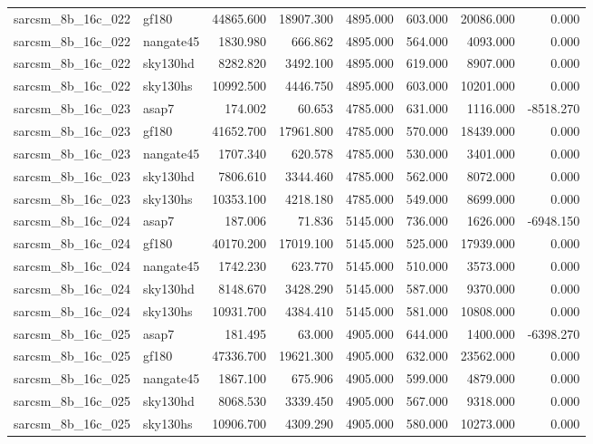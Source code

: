 \begin{tabular}{llrrrrrr}
sarcsm\_8b\_16c\_022 & gf180 & 44865.600 & 18907.300 & 4895.000 & 603.000 & 20086.000 & 0.000 \\
sarcsm\_8b\_16c\_022 & nangate45 & 1830.980 & 666.862 & 4895.000 & 564.000 & 4093.000 & 0.000 \\
sarcsm\_8b\_16c\_022 & sky130hd & 8282.820 & 3492.100 & 4895.000 & 619.000 & 8907.000 & 0.000 \\
sarcsm\_8b\_16c\_022 & sky130hs & 10992.500 & 4446.750 & 4895.000 & 603.000 & 10201.000 & 0.000 \\
sarcsm\_8b\_16c\_023 & asap7 & 174.002 & 60.653 & 4785.000 & 631.000 & 1116.000 & -8518.270 \\
sarcsm\_8b\_16c\_023 & gf180 & 41652.700 & 17961.800 & 4785.000 & 570.000 & 18439.000 & 0.000 \\
sarcsm\_8b\_16c\_023 & nangate45 & 1707.340 & 620.578 & 4785.000 & 530.000 & 3401.000 & 0.000 \\
sarcsm\_8b\_16c\_023 & sky130hd & 7806.610 & 3344.460 & 4785.000 & 562.000 & 8072.000 & 0.000 \\
sarcsm\_8b\_16c\_023 & sky130hs & 10353.100 & 4218.180 & 4785.000 & 549.000 & 8699.000 & 0.000 \\
sarcsm\_8b\_16c\_024 & asap7 & 187.006 & 71.836 & 5145.000 & 736.000 & 1626.000 & -6948.150 \\
sarcsm\_8b\_16c\_024 & gf180 & 40170.200 & 17019.100 & 5145.000 & 525.000 & 17939.000 & 0.000 \\
sarcsm\_8b\_16c\_024 & nangate45 & 1742.230 & 623.770 & 5145.000 & 510.000 & 3573.000 & 0.000 \\
sarcsm\_8b\_16c\_024 & sky130hd & 8148.670 & 3428.290 & 5145.000 & 587.000 & 9370.000 & 0.000 \\
sarcsm\_8b\_16c\_024 & sky130hs & 10931.700 & 4384.410 & 5145.000 & 581.000 & 10808.000 & 0.000 \\
sarcsm\_8b\_16c\_025 & asap7 & 181.495 & 63.000 & 4905.000 & 644.000 & 1400.000 & -6398.270 \\
sarcsm\_8b\_16c\_025 & gf180 & 47336.700 & 19621.300 & 4905.000 & 632.000 & 23562.000 & 0.000 \\
sarcsm\_8b\_16c\_025 & nangate45 & 1867.100 & 675.906 & 4905.000 & 599.000 & 4879.000 & 0.000 \\
sarcsm\_8b\_16c\_025 & sky130hd & 8068.530 & 3339.450 & 4905.000 & 567.000 & 9318.000 & 0.000 \\
sarcsm\_8b\_16c\_025 & sky130hs & 10906.700 & 4309.290 & 4905.000 & 580.000 & 10273.000 & 0.000 \\

\end{tabular}
